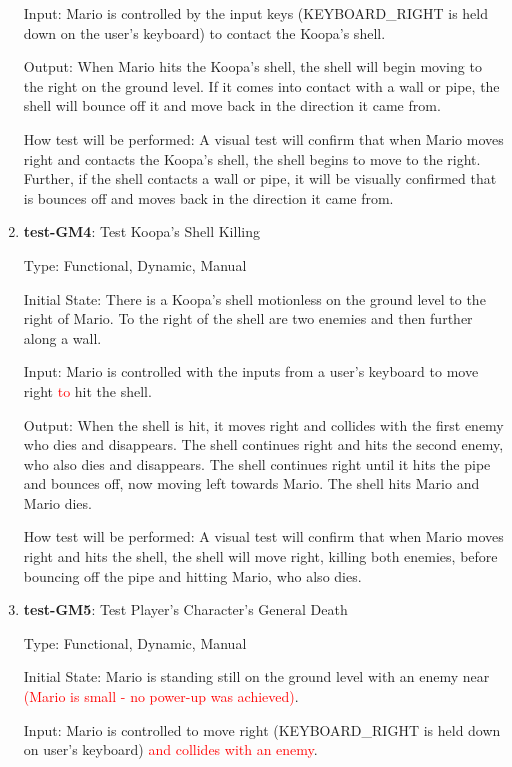 \documentclass[12pt, titlepage]{article}
\begin{document}
\begin{enumerate}
Input: Mario is controlled by the input keys (KEYBOARD\_RIGHT is held down on the user's keyboard) to contact the Koopa's shell.

Output: When Mario hits the Koopa's shell, the shell will begin moving to the right on the ground level. If it comes into contact with a wall or pipe, the shell will bounce off it and move back in the direction it came from.

How test will be performed: A visual test will confirm that when Mario moves right and contacts the Koopa's shell, the shell begins to move to the right. Further, if the shell contacts a wall or pipe, it will be visually confirmed that is bounces off and moves back in the direction it came from.

\item{\textbf{test-GM4}: Test Koopa's Shell Killing\\}

Type: Functional, Dynamic, Manual

Initial State: There is a Koopa's shell motionless on the ground level to the right of Mario. To the right of the shell are two enemies and then further along a wall.

Input: Mario is controlled with the inputs from a user's keyboard to move right \textcolor{red}{to} hit the shell.

Output: When the shell is hit, it moves right and collides with the first enemy who dies and disappears. The shell continues right and hits the second enemy, who also dies and disappears. The shell continues right until it hits the pipe and bounces off, now moving left towards Mario. The shell hits Mario and Mario dies.

How test will be performed: A visual test will confirm that when Mario moves right and hits the shell, the shell will move right, killing both enemies, before bouncing off the pipe and hitting Mario, who also dies.

\item{\textbf{test-GM5}: Test Player's Character's General Death\\}

Type: Functional, Dynamic, Manual

Initial State: Mario is standing still on the ground level with an enemy near \textcolor{red}{(Mario is small - no power-up was achieved)}.

Input: Mario is controlled to move right (KEYBOARD\_RIGHT is held down on user's keyboard) \textcolor{red}{and collides with an enemy}.


\end{enumerate}
\end{document}
